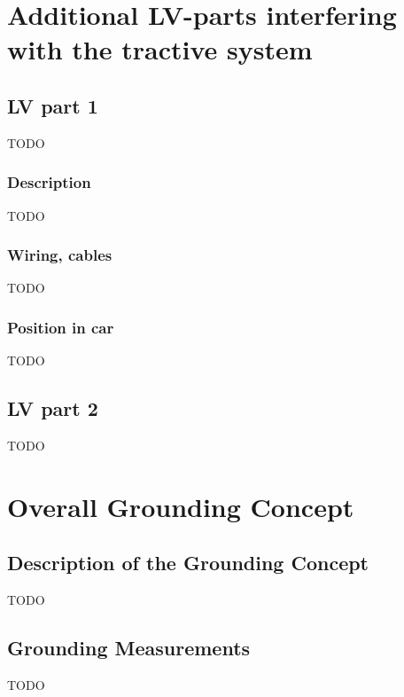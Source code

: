 \documentclass{article}
\begin{document}
\section{Additional LV-parts interfering with the tractive system}
\subsection{LV part 1}
TODO

\subsubsection{Description}
TODO

\subsubsection*{Wiring, cables}
TODO

\subsubsection{Position in car}
TODO

\subsection{LV part 2}
TODO

\section{Overall Grounding Concept}
\subsection{Description of the Grounding Concept}
TODO

\subsection{Grounding Measurements}
TODO
\end{document}
